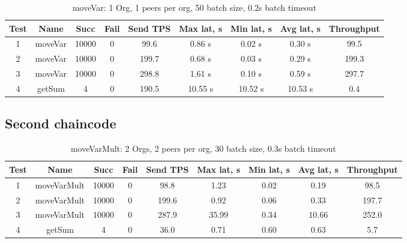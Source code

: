 \begin{appendices}
\begin{table}[H]
\begin{center}
\begin{tabular}{ |c|c|c|c|c|c|c|c|c| }
 \hline
  Test & Name & Succ  & Fail & Send TPS & Max lat, s & Min lat, s & Avg lat, s & Throughput \\
 \hline
 \hline
 1 & moveVar  & 10000  & 0 & 99.6 & 0.86 s & 0.02 s & 0.30 s & 99.5  \\
  \hline
 2 & moveVar  & 10000  & 0 & 199.7  & 0.68 s & 0.03 s & 0.29 s & 199.3 \\
  \hline
 3 & moveVar  & 10000  & 0 & 298.8  & 1.61 s & 0.10 s & 0.59 s & 297.7 \\
  \hline
 4 & getSum  & 4  & 0  & 190.5  & 10.55 s  & 10.52 s  & 10.53 s  & 0.4 \\
 \hline
\end{tabular}
\end{center}
\caption{moveVar: 1 Org, 1 peers per org, 50 batch size, 0.2s batch timeout}
\end{table}

\subsection{Second chaincode} \label{apdx:snd}

\begin{table}[H]
\begin{center}
\begin{tabular}{ |c|c|c|c|c|c|c|c|c| }
 \hline
  Test & Name & Succ  & Fail & Send TPS & Max lat, s & Min lat, s & Avg lat, s & Throughput \\
 \hline
 \hline
 1    & moveVarMult & 10000 & 0    & 98.8  & 1.23      & 0.02      & 0.19      & 98.5   \\
 \hline
 2    & moveVarMult & 10000 & 0    & 199.6 & 0.92      & 0.06      & 0.33      & 197.7  \\
 \hline
 3    & moveVarMult & 10000 & 0    & 287.9 & 35.99     & 0.34      & 10.66     & 252.0  \\
 \hline
 4    & getSum      & 4     & 0    & 36.0  & 0.71      & 0.60      & 0.63      & 5.7    \\
 \hline
\end{tabular}
\end{center}
\caption{moveVarMult: 2 Orgs, 2 peers per org, 30 batch size, 0.3s batch timeout}
\end{table}


\end{appendices}
